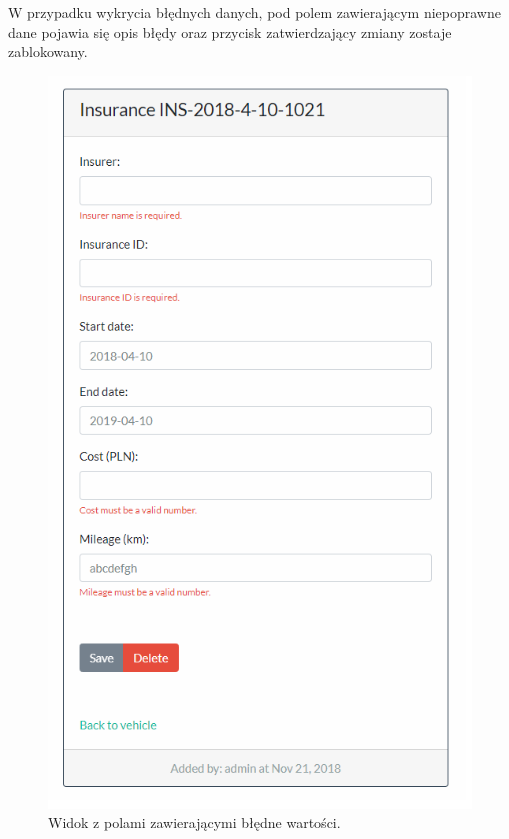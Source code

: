 \documentclass[eng,printmode,openany]{mgr}
\begin{document}
	
	
	W przypadku wykrycia błędnych danych, pod polem zawierającym niepoprawne dane pojawia się opis błędy oraz przycisk zatwierdzający zmiany zostaje zablokowany.
	\begin{figure}[H]
		\centering
		\includegraphics[scale=0.7]{images/insurance_validation_errors.png}
		\caption{Widok z polami zawierającymi błędne wartości.}
	\end{figure}
\end{document}
